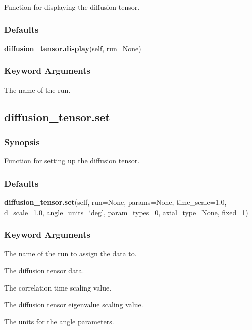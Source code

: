 Function for displaying the diffusion tensor.

\subsubsection{Defaults}

\textsf{\textbf{diffusion\_tensor.display}(self, run=None)}


\subsubsection{Keyword Arguments}


  The name of the run.


\newpage

\subsection{diffusion\_tensor.set}


\subsubsection{Synopsis}

Function for setting up the diffusion tensor.

\subsubsection{Defaults}

\textsf{\textbf{diffusion\_tensor.set}(self, run=None, params=None, time\_scale=1.0, d\_scale=1.0, angle\_units=`deg', param\_types=0, axial\_type=None, fixed=1)}


\subsubsection{Keyword Arguments}


  The name of the run to assign the data to.

  The diffusion tensor  data.

  The correlation time  scaling value.

  The diffusion tensor  eigenvalue  scaling value.

  The units for the angle  parameters.

